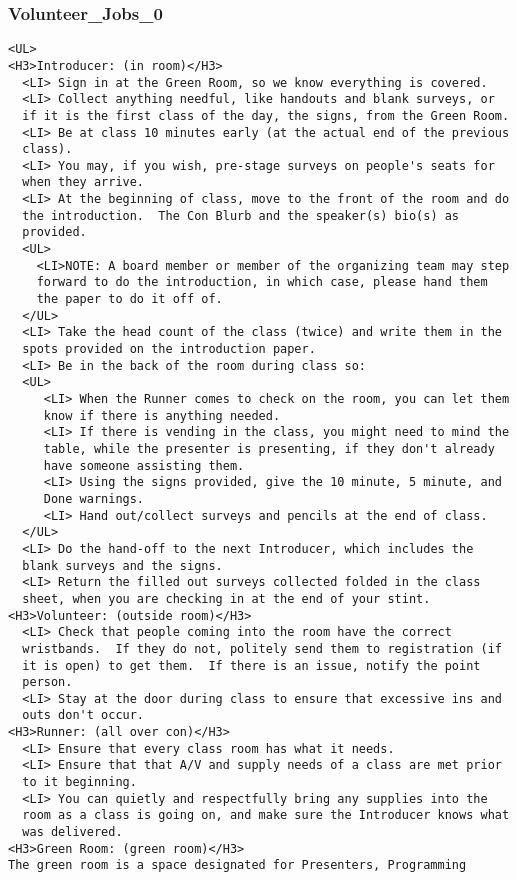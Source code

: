 \documentclass[captions=tablesignature]{scrartcl}
\begin{document}
\subsubsection{Volunteer\_Jobs\_0}
\label{sec-3-7-5}
\begin{verbatim}
<UL>
<H3>Introducer: (in room)</H3>
  <LI> Sign in at the Green Room, so we know everything is covered.
  <LI> Collect anything needful, like handouts and blank surveys, or
  if it is the first class of the day, the signs, from the Green Room.
  <LI> Be at class 10 minutes early (at the actual end of the previous
  class).
  <LI> You may, if you wish, pre-stage surveys on people's seats for
  when they arrive.
  <LI> At the beginning of class, move to the front of the room and do
  the introduction.  The Con Blurb and the speaker(s) bio(s) as
  provided.
  <UL>
    <LI>NOTE: A board member or member of the organizing team may step
    forward to do the introduction, in which case, please hand them
    the paper to do it off of.
  </UL>
  <LI> Take the head count of the class (twice) and write them in the
  spots provided on the introduction paper.
  <LI> Be in the back of the room during class so:
  <UL>
     <LI> When the Runner comes to check on the room, you can let them
     know if there is anything needed.
     <LI> If there is vending in the class, you might need to mind the
     table, while the presenter is presenting, if they don't already
     have someone assisting them.
     <LI> Using the signs provided, give the 10 minute, 5 minute, and
     Done warnings.
     <LI> Hand out/collect surveys and pencils at the end of class.
  </UL>
  <LI> Do the hand-off to the next Introducer, which includes the
  blank surveys and the signs.
  <LI> Return the filled out surveys collected folded in the class
  sheet, when you are checking in at the end of your stint.
<H3>Volunteer: (outside room)</H3>
  <LI> Check that people coming into the room have the correct
  wristbands.  If they do not, politely send them to registration (if
  it is open) to get them.  If there is an issue, notify the point
  person.
  <LI> Stay at the door during class to ensure that excessive ins and
  outs don't occur.
<H3>Runner: (all over con)</H3>
  <LI> Ensure that every class room has what it needs.
  <LI> Ensure that that A/V and supply needs of a class are met prior
  to it beginning.
  <LI> You can quietly and respectfully bring any supplies into the
  room as a class is going on, and make sure the Introducer knows what
  was delivered.
<H3>Green Room: (green room)</H3>
The green room is a space designated for Presenters, Programming

\end{verbatim}
\end{document}
